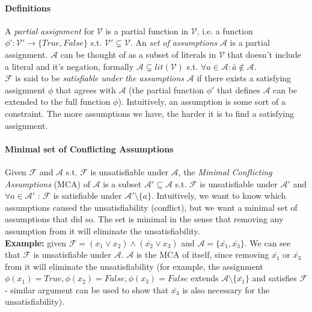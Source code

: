 \documentclass[]{article}
\begin{document}
\paragraph{Definitions} A \textit{partial assignment} for $ \mathcal{V} $ is a partial function in $ \mathcal{V} $, i.e. a function $ \phi' : \mathcal{V}' \rightarrow \{True, False\} $ s.t. $\mathcal{V}' \subsetneq \mathcal{V}$. An \textit{set of assumptions} $ \mathcal{A} $ is a partial assignment. $ \mathcal{A} $ can be thought of as a subset of literals in $\mathcal{V}$ that doesn't include a literal and it's negation, formally $ \mathcal{A} \subsetneq lit(\mathcal{V}) $ s.t. $ \forall a \in \mathcal{A} : \bar{a} \notin \mathcal{A} $.\\
$ \mathcal{F} $ is said to be \textit{satisfiable under the assumptions} $ \mathcal{A} $ if there exists a satisfying assignment $ \phi $ that agrees with $ \mathcal{A} $ (the partial function $ \phi' $ that defines $ \mathcal{A} $ can be extended to the full function $ \phi $). Intuitively, an assumption is some sort of a constraint. The more assumptions we have, the harder it is to find a satisfying assignment.
\paragraph{Minimal set of Conflicting Assumptions} Given $ \mathcal{F} $ and $ \mathcal{A} $ s.t. $ \mathcal{F} $ is unsatisfiable under $ \mathcal{A} $, the \textit{Minimal Conflicting Assumptions} (MCA) of $ \mathcal{A} $ is a subset $ \mathcal{A}' \subseteq \mathcal{A} $ s.t. $ \mathcal{F} $ is unsatisfiable under $ \mathcal{A}' $ and $ \forall a \in \mathcal{A}' $ : $ \mathcal{F} $ is satisfiable under $ \mathcal{A}' \setminus \{a\} $. Intuitively, we want to know which assumptions caused the unsatisfiability (conflict), but we want a minimal set of assumptions that did so. The set is minimal in the sense that removing any assumption from it will eliminate the unsatisfiability.\\
\textbf{Example: } given  $\mathcal{F} = (x_1 \lor x_2) \land (\bar{x_2} \lor x_3)$ and $\mathcal{A} =\{\bar{x_1}, \bar{x_3}\}$. We can see that $ \mathcal{F} $ is unsatisfiable under $ \mathcal{A} $. $ \mathcal{A} $ is the MCA of itself, since removing $\bar{x_1}$ or $\bar{x_3}$ from it will eliminate the unsatisfiability (for example, the assignment $ \phi(x_1)=True,\phi(x_2)=False, \phi(x_3)=False $ extends $ \mathcal{A} \setminus \{\bar{x_1}\} $ and satisfies $\mathcal{F}$ - similar argument can be used to show that $\bar{x_3}$ is also necessary for the unsatisfiability).
\end{document}
